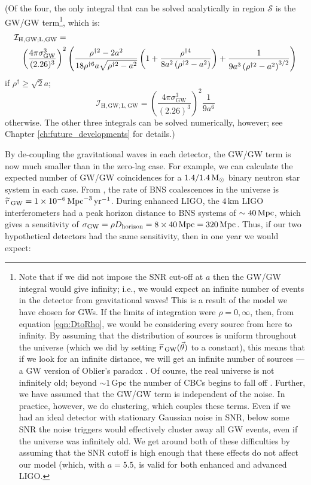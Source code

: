 (Of the four, the only integral that can be solved analytically in region $\mathcal{S}$ is the GW/GW term\footnote{Note that if we did not impose the \ac{SNR} cut-off at $a$ then the GW/GW integral would give infinity; i.e., we would expect an infinite number of events in the detector from gravitational waves! This is a result of the model we have chosen for \acp{GW}. If the limits of integration were $\rho = 0,\infty$, then, from equation \ref{eqn:DtoRho}, we would be considering every source from here to infinity. By assuming that the distribution of sources is uniform throughout the universe (which we did by setting $\widetilde{r}\,_{\mathrm{GW}}(\vec{\theta})$ to a constant), this means that if we look for an infinite distance, we will get an infinite number of sources --- a \ac{GW} version of Oblier's paradox \cite{obliers_paradox}. Of course, the real universe is not infinitely old; beyond $\sim 1\,\mathrm{Gpc}$ the number of \acp{CBC} begins to fall off \cite{rates_paper}. Further, we have assumed that the GW/GW term is independent of the noise. In practice, however, we do clustering, which couples these terms. Even if we had an ideal detector with stationary Gaussian noise in \ac{SNR}, below some \ac{SNR} the noise triggers would effectively cluster away all \ac{GW} events, even if the universe was infinitely old. We get around both of these difficulties by assuming that the \ac{SNR} cutoff is high enough that these effects do not affect our model (which, with $a=5.5$, is valid for both enhanced and advanced \ac{LIGO}.}, which is:
\begin{eqnarray}
\lefteqn{ \mathcal{I}_{\mathrm{H,GW;L,GW}} = } \nonumber \\
 & & \left( \frac{4\pi \sigma_{\mathrm{GW}}^3}{(2.26)^3} \right)^2 \left( \frac{\rho^{\dagger2} - 2a^2}{18 \rho^{\dagger6} a \sqrt{\rho^{\dagger2} - a^2}} \left( 1 + \frac{\rho^{\dagger4}}{8a^2\left(\rho^{\dagger2} - a^2 \right)} \right) + \frac{1}{9a^3 \left(\rho^{\dagger2} - a^2 \right)^{3/2}} \right)
\end{eqnarray}
if $\rho^\dagger \geq \sqrt{2}a$;
\begin{equation}
\mathcal{I}_{\mathrm{H,GW;L,GW}} = \left( \frac{4\pi \sigma_{\mathrm{GW}}^3}{(2.26)^3} \right)^2 \frac{1}{9a^6}
\end{equation}
otherwise. The other three integrals can be solved numerically, however; see Chapter \ref{ch:future_developments} for details.)

By de-coupling the gravitational waves in each detector, the GW/GW term is now much smaller than in the zero-lag case. For example, we can calculate the expected number of GW/GW coincidences for a $1.4/1.4\,\mathrm{M_\odot}$ binary neutron star system in each case. From \cite{rates paper}, the rate of \ac{BNS} coalescences in the universe is $\widetilde{r}\,_{\mathrm{GW}} = 1 \times 10^{-6} \,\mathrm{Mpc}^{-3}\,\mathrm{yr}^{-1}$. During enhanced \ac{LIGO}, the $4\,\mathrm{km}$ \ac{LIGO} interferometers had a peak horizon distance to \ac{BNS} systems of $\sim40\,\mathrm{Mpc}$, which gives a sensitivity of $\sigma_{\mathrm{GW}} = \rho D_{\mathrm{horizon}} = 8 \times 40\,\mathrm{Mpc} = 320\,\mathrm{Mpc}$. Thus, if our two hypothetical detectors had the same sensitivity, then in one year we would expect:

